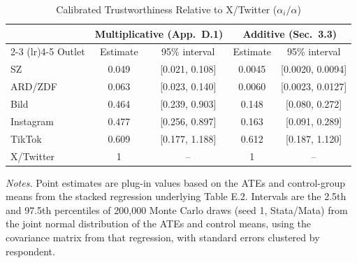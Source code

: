 \begin{table}[H]
\centering
\caption{Calibrated Trustworthiness Relative to X/Twitter ($\alpha_i/\alpha$)}
\label{tab:relative_alpha}
\begin{tabular}{lcccc}
\toprule
 & \multicolumn{2}{c}{Multiplicative (App.\ D.1)} & \multicolumn{2}{c}{Additive (Sec.\ 3.3)} \\
\cmidrule(lr){2-3} \cmidrule(lr){4-5}
Outlet & Estimate & 95\% interval & Estimate & 95\% interval \\
\midrule
SZ & 0.049 & [0.021, 0.108] & 0.0045 & [0.0020, 0.0094] \\
ARD/ZDF & 0.063 & [0.023, 0.140] & 0.0060 & [0.0023, 0.0127] \\
Bild & 0.464 & [0.239, 0.903] & 0.148 & [0.080, 0.272] \\
Instagram & 0.477 & [0.256, 0.897] & 0.163 & [0.091, 0.289] \\
TikTok & 0.609 & [0.177, 1.188] & 0.612 & [0.187, 1.120] \\
X/Twitter & 1 & -- & 1 & -- \\
\bottomrule
\end{tabular}
\par
\begin{minipage}{\linewidth}
\baselineskip9pt {\scriptsize \vspace{0.1cm} {\it Notes.} Point estimates are plug-in values based on the ATEs and control-group means from the stacked regression underlying Table E.2. Intervals are the 2.5th and 97.5th percentiles of 200,000 Monte Carlo draws (seed 1, Stata/Mata) from the joint normal distribution of the ATEs and control means, using the covariance matrix from that regression, with standard errors clustered by respondent.}
\end{minipage}
\end{table}
